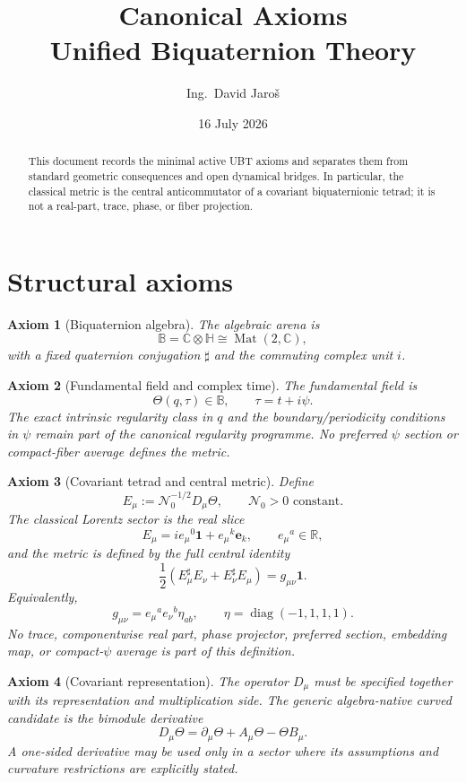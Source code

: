 \documentclass[11pt,a4paper]{article}
\title{Canonical Axioms\\\large Unified Biquaternion Theory}
\author{Ing.\ David Jaroš}
\date{16 July 2026}
\newtheorem{axiom}{Axiom}
\begin{document}
\maketitle

\begin{abstract}
This document records the minimal active UBT axioms and separates them from
standard geometric consequences and open dynamical bridges.  In particular,
the classical metric is the central anticommutator of a covariant
biquaternionic tetrad; it is not a real-part, trace, phase, or fiber projection.
\end{abstract}

\section{Structural axioms}

\begin{axiom}[Biquaternion algebra]
The algebraic arena is
\[
 \mathbb B=\mathbb C\otimes\mathbb H\cong\operatorname{Mat}(2,\mathbb C),
\]
with a fixed quaternion conjugation $\sharp$ and the commuting complex unit
$i$.
\end{axiom}

\begin{axiom}[Fundamental field and complex time]
The fundamental field is
\[
 \Theta(q,\tau)\in\mathbb B,
 \qquad \tau=t+i\psi.
\]
The exact intrinsic regularity class in $q$ and the boundary/periodicity
conditions in $\psi$ remain part of the canonical regularity programme.  No
preferred $\psi$ section or compact-fiber average defines the metric.
\end{axiom}

\begin{axiom}[Covariant tetrad and central metric]
Define
\[
 E_\mu:=\mathcal N_0^{-1/2}D_\mu\Theta,
 \qquad \mathcal N_0>0\text{ constant}.
\]
The classical Lorentz sector is the real slice
\[
 E_\mu=i e_\mu{}^0\mathbf1+e_\mu{}^k\mathbf e_k,
 \qquad e_\mu{}^a\in\mathbb R,
\]
and the metric is defined by the full central identity
\[
 \boxed{\frac12(E_\mu^\sharp E_\nu+E_\nu^\sharp E_\mu)
       =g_{\mu\nu}\mathbf1.}
\]
Equivalently,
\[
 g_{\mu\nu}=e_\mu{}^a e_\nu{}^b\eta_{ab},
 \qquad \eta=\operatorname{diag}(-1,1,1,1).
\]
No trace, componentwise real part, phase projector, preferred section,
embedding map, or compact-$\psi$ average is part of this definition.
\end{axiom}

\begin{axiom}[Covariant representation]
The operator $D_\mu$ must be specified together with its representation and
multiplication side.  The generic algebra-native curved candidate is the
bimodule derivative
\[
 D_\mu\Theta=\partial_\mu\Theta+A_\mu\Theta-\Theta B_\mu.
\]
A one-sided derivative may be used only in a sector where its assumptions and
curvature restrictions are explicitly stated.
\end{axiom}
\end{document}
